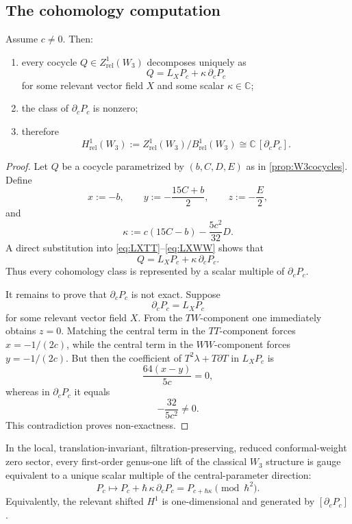 \subsection{The cohomology computation}

\begin{theorem}\label{thm:H1W3}
Assume $c\neq 0$. Then:
\begin{enumerate}[leftmargin=2.4em]
\item every cocycle $Q\in Z^1_{\mathrm{rel}}(W_3)$ decomposes uniquely as
\[
Q=L_XP_c+\kappa\,\partial_c P_c
\]
for some relevant vector field $X$ and some scalar $\kappa\in \mathbb C$;
\item the class of $\partial_c P_c$ is nonzero;
\item therefore
\[
H^1_{\mathrm{rel}}(W_3):=
Z^1_{\mathrm{rel}}(W_3)/B^1_{\mathrm{rel}}(W_3)
\cong \mathbb C\,[\partial_cP_c].
\]
\end{enumerate}
\end{theorem}

\begin{proof}
Let $Q$ be a cocycle parametrized by $(b,C,D,E)$ as in \cref{prop:W3cocycles}.
Define
\[
x:=-b,\qquad
y:=-\frac{15C+b}{2},\qquad
z:=-\frac E2,
\]
and
\[
\kappa:=c(15C-b)-\frac{5c^2}{32}D.
\]
A direct substitution into \eqref{eq:LXTT}--\eqref{eq:LXWW} shows that
\[
Q=L_XP_c+\kappa\,\partial_cP_c.
\]
Thus every cohomology class is represented by a scalar multiple of $\partial_cP_c$.

It remains to prove that $\partial_cP_c$ is not exact. Suppose
\[
\partial_cP_c=L_XP_c
\]
for some relevant vector field $X$. From the $TW$-component one immediately obtains
$z=0$. Matching the central term in the $TT$-component forces $x=-1/(2c)$, while the
central term in the $WW$-component forces $y=-1/(2c)$. But then the coefficient of
$T^2\lambda+T\partial T$ in $L_XP_c$ is
\[
\frac{64(x-y)}{5c}=0,
\]
whereas in $\partial_cP_c$ it equals
\[
-\frac{32}{5c^2}\neq 0.
\]
This contradiction proves non-exactness.
\end{proof}

\begin{corollary}\label{cor:unique-lift}
In the local, translation-invariant, filtration-preserving, reduced conformal-weight zero
sector, every first-order genus-one lift of the classical $W_3$ structure is gauge equivalent
to a unique scalar multiple of the central-parameter direction:
\[
P_c\longmapsto P_c+\hbar\,\kappa\,\partial_cP_c
=
P_{c+\hbar\kappa}\pmod{\hbar^2}.
\]
Equivalently, the relevant shifted $H^1$ is one-dimensional and generated by
$[\partial_cP_c]$.
\end{corollary}

